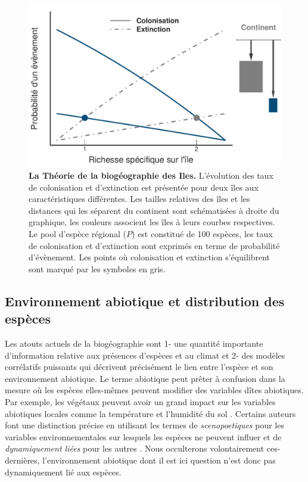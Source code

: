 \begin{figure}[htbp]
\centering
\includegraphics{fig/fig1.pdf}
\caption{\textbf{La Théorie de la biogéographie des Iles.} L'évolution
des taux de colonisation et d'extinction est présentée pour deux îles
aux caractéristiques différentes. Les tailles relatives des îles et les
distances qui les séparent du continent sont schématisées à droite du
graphique, les couleurs associent les îles à leurs courbes respectives.
Le pool d'espèce régional (\(P\)) est constitué de 100 espèces, les taux
de colonisation et d'extinction sont exprimés en terme de probabilité
d'évènement. Les points où colonisation et extinction s'équilibrent sont
marqué par les symboles en gris.\label{fig:figMW}}
\end{figure}

\subsection{Environnement abiotique et distribution des espèces}

Les atouts actuels de la biogéographie sont 1- une quantité importante
d'information relative aux présences d'espèces et au climat et 2- des
modèles corrélatifs puissants qui décrivent précisément le lien entre
l'espèce et son environnement abiotique. Le terme abiotique peut prêter
à confusion dans la mesure où les espèces elles-mêmes peuvent modifier
des variables dîtes abiotiques. Par exemple, les végétaux peuvent avoir
un grand impact sur les variables abiotiques locales comme la
température et l'humidité du sol \cite{Breshears1998}. Certains auteurs
font une distinction précise en utilisant les termes de
\textit{scenopoetiques} pour les variables environnementales sur
lesquels les espèces ne peuvent influer et de
\textit{dynamiquement liées} pour les autres \cite{Peterson2011}. Nous
occulterons volontairement ces-dernières, l'environnement abiotique dont
il est ici question n'est donc pas dynamiquement lié aux espèces.

